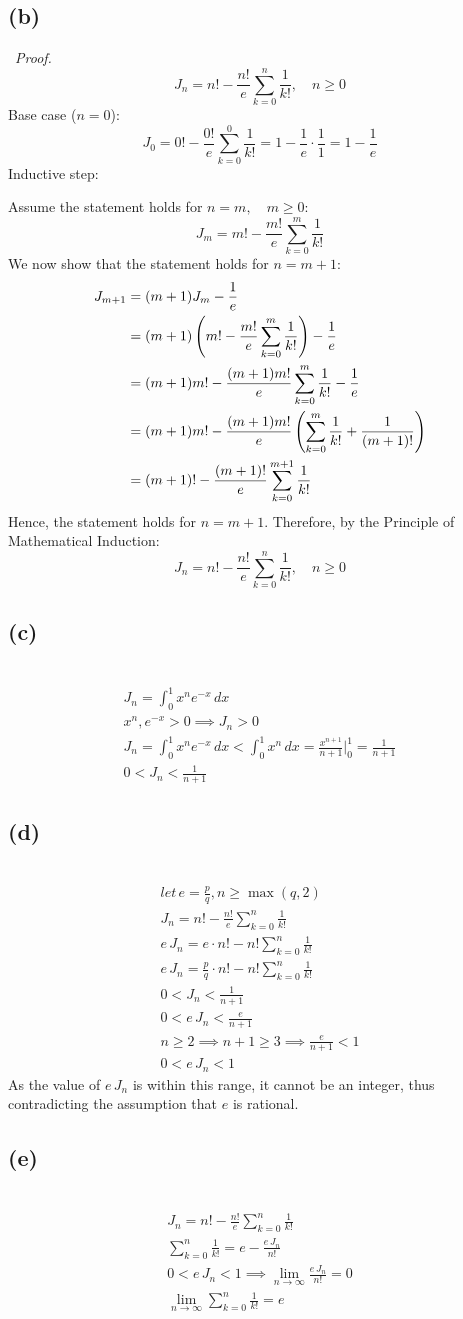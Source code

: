 \documentclass[12pt]{article}
\newcommand*{\paren}[1]{\ensuremath\left(#1\right)}
\newcommand{\vem}{\vspace{0.5em}}
\newcommand{\subproblem}[1]{\subsection{(#1)} \,}
\begin{document}
\subproblem{b}
\vem
\textit{Proof.}
\[
J_n=n!-\frac{n!}{e}\sum_{k=0}^n \frac{1}{k!},\quad n\ge 0
\]
Base case ($n=0$):
\[
J_0=0!- \frac{0!}{e} \sum_{k=0}^0 \frac{1}{k!} =1-\frac{1}{e}\cdot \frac{1}{1}= 1-\frac{1}{e}
\]
Inductive step: 

Assume the statement holds for $n=m,\quad m\ge 0$:
\[
J_m= m! - \frac{m!}{e}\sum_{k=0}^m \frac{1}{k!}
\]  
We now show that the statement holds for $n=m+1$:
\begin{align*}
    J_{m+1} &= (m+1)J_{m} - \frac{1}{e}\\
    &= (m+1)\paren{m! - \frac{m!}{e}\sum_{k=0}^m \frac{1}{k!}} - \frac{1}{e}\\
    &=(m+1)m!- \frac{(m+1)m!}{e} \sum_{k=0}^m \frac{1}{k!} - \frac{1}{e}\\
    &=(m+1)m!- \frac{(m+1)m!}{e} \paren{\sum_{k=0}^m \frac{1}{k!} + \frac{1}{(m+1)!}}\\
    &= (m+1)! - \frac{(m+1)!}{e} \sum_{k=0}^{m+1} \frac{1}{k!}
\end{align*}
Hence, the statement holds for $n=m+1$. Therefore, by the Principle of Mathematical Induction:
\[
J_n=n!-\frac{n!}{e}\sum_{k=0}^n \frac{1}{k!},\quad n\ge 0
\]

\subproblem{c}
\begin{gather*}
    J_n=\int_0^1 x^ne^{-x}\, dx\\
    x^n, e^{-x }>0 \implies J_n>0\\
    J_n=\int_0^1 x^ne^{-x}\, dx < \int_0^1 x^n\, dx = \frac{x^{n+1}}{n+1} \Bigg|^1_0=\frac{1}{n+1}\\
    \boxed{0 < J_n< \frac{1}{n+1}}
\end{gather*}

\subproblem{d}
\begin{gather*}
    let \, e=\frac{p}{q},n\ge \max (q,2)\\
    J_n=n!-\frac{n!}{e}\sum_{k=0}^n \frac{1}{k!}\\
    e\, J_n= e\cdot n! - n! \sum_{k=0}^n \frac{1}{k!}\\
    e\, J_n= \boxed{\frac{p}{q}\cdot n! - n! \sum_{k=0}^n \frac{1}{k!}}\\
    0 < J_n< \frac{1}{n+1}\\
    0 < e\, J_n< \frac{e}{n+1}\\
    n \ge 2 \implies n +1 \ge  3 \implies \frac{e}{n+1}<1\\
    \boxed{0< e\, J_n < 1}
\end{gather*}
As the value of $e\, J_n$ is within this range, it cannot be an integer, thus contradicting the assumption that $e$ is rational.\vem

\subproblem{e}
\begin{gather*}
    J_n=n!-\frac{n!}{e}\sum_{k=0}^n \frac{1}{k!}\\
    \sum_{k=0}^n \frac{1}{k!} = e - \frac{e \, J_n}{n!}\\
    0< e\, J_n < 1 \implies \lim_{n \to \infty }\frac{e \, J_n}{n!} =0\\
    \boxed{\lim_{n\to \infty} \sum_{k=0}^n \frac{1}{k!} =e}
\end{gather*}
\end{document}
